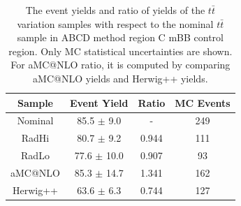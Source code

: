 %
\begin{table}[htbp!]
\begin{center}
\begin{tabular}{c|c|c||c}
Sample     & Event Yield       & Ratio  & MC Events \\ 
\hline
Nominal    & 85.5 $\pm$ 9.0    & -      & 249  \\
RadHi      & 80.7 $\pm$ 9.2    & 0.944  & 111  \\
RadLo      & 77.6 $\pm$ 10.0   & 0.907  &  93  \\
aMC@NLO    & 85.3 $\pm$ 14.7   & 1.341  & 162  \\
Herwig++   & 63.6 $\pm$ 6.3    & 0.744  & 127  \\
\end{tabular}
\end{center}
\caption{The event yields and ratio of yields of the $t\bar{t}$ variation samples
with respect to the nominal $t\bar{t}$ sample in ABCD method region C mBB control region.
Only MC statistical uncertainties are shown. For aMC@NLO ratio, it is computed by comparing 
aMC@NLO yields and Herwig++ yields.} 
\label{tab:boosted_qcd_region_c_mbbcr_systematics_ttbar_yields}
\end{table}

